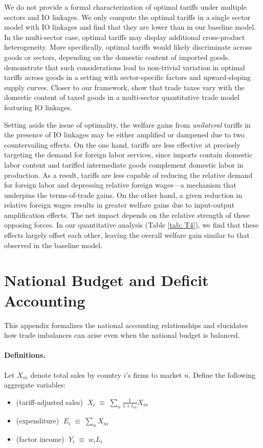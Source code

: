 \documentclass[12pt]{article}
\begin{document}
We do not provide a formal characterization of optimal tariffs under multiple sectors and IO linkages. We only compute the optimal tariffs in a single sector model with IO linkages and find that they are lower than in our baseline model. In the multi-sector case, optimal tariffs may display additional cross-product heterogeneity. More specifically, optimal tariffs would likely discriminate across goods or sectors, depending on the domestic content of imported goods. \citet{blanchard2016global} demonstrate that such considerations lead to non-trivial variation in optimal tariffs across goods in a setting with sector-specific factors and upward-sloping supply curves. Closer to our framework, \citet{lashkaripour2023profits} show that trade taxes vary with the domestic content of taxed goods in a multi-sector quantitative trade model featuring IO linkages.

Setting aside the issue of optimality, the welfare gains from \emph{unilateral} tariffs in the presence of IO linkages may be either amplified or dampened due to two countervailing effects. On the one hand, tariffs are less effective at precisely targeting the demand for foreign labor services, since imports contain domestic labor content and tariffed intermediate goods complement domestic labor in production. As a result, tariffs are less capable of reducing the relative demand for foreign labor and depressing relative foreign wages---a mechanism that underpins the terms-of-trade gains. On the other hand, a given reduction in relative foreign wages results in greater welfare gains due to input-output amplification effects. The net impact depends on the relative strength of these opposing forces. In our quantitative analysis (Table \ref{tab: T4}), we find that these effects largely offset each other, leaving the overall welfare gain similar to that observed in the baseline model.

\section{National Budget and Deficit Accounting}\label{app:deficit}

This appendix formalizes the national accounting relationships and elucidates how trade imbalances can arise even when the national budget is balanced.

\paragraph{Definitions.}
Let $X_{in}$ denote total sales by country $i$'s firms to market $n$. Define the following aggregate variables:
\begin{itemize}
    \item   (tariff-adjusted sales)  $\; X_i \; \equiv \; \sum_{n} \frac{1}{1+t_{in}} X_{in}$
    \item (expenditure) $\; E_i \; \equiv \; \sum_{n} X_{ni}$
    \item (factor income) $\; Y_i \; \equiv \; w_i L_i$
\end{itemize}
\end{document}
